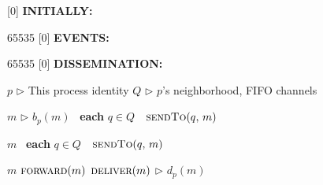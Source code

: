 
[0] {\textbf{INITIALLY:}}

{65535}{}
[0] {\textbf{EVENTS:}}

{65535}{}
[0] {\textbf{DISSEMINATION:}}


\newcommand{\comment}[1]{$\rhd$ #1}
\newcommand{\LINEIFTHEN}[2]{%
  \algorithmicif\ {#1}\ \algorithmicthen\ {#2} %
}
\newcommand{\LINEIFTHENELSE}[3]{%
  \algorithmicif\ {#1}\ \algorithmicthen\ {#2} \algorithmicelse\ {#3}%
}

\newcommand{\LINEFOR}[2]{%
  \algorithmicfor\ {#1}\ \algorithmicdo\ {#2} %
}

\begin{algorithmic}[1]
  \small

  \initially
  \State $p$ \hfill \comment{This process identity}
  \State $Q$ \hfill \comment{$p$'s neighborhood, FIFO channels}
  \endInitially
  
  \dissemination

   {$m$} \hfill \comment{$b_p(m)$}
  \State \LINEFOR{\textbf{each} $q \in Q$} 
  {$\textsc{sendTo}(q,\, m)$}
  \EndFunction
  
  \Statex

   {$m$}
  \State \LINEFOR{\textbf{each} $q \in Q$} 
  {$\textsc{sendTo}(q,\, m)$}
  \EndFunction

  \Statex
  
   {$m$}  
  \State $\textsc{forward}(m)$
  \State $\textsc{deliver}(m)$ \hfill \comment{$d_p(m)$}
  \EndIf

  \EndFunction

\end{algorithmic}


